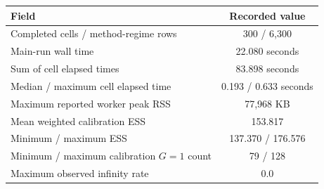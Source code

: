 \begin{tabular}{lc}
\toprule
Field & Recorded value \\
\midrule
Completed cells / method-regime rows & 300 / 6,300 \\
Main-run wall time & 22.080 seconds \\
Sum of cell elapsed times & 83.898 seconds \\
Median / maximum cell elapsed time & 0.193 / 0.633 seconds \\
Maximum reported worker peak RSS & 77,968 KB \\
Mean weighted calibration ESS & 153.817 \\
Minimum / maximum ESS & 137.370 / 176.576 \\
Minimum / maximum calibration $G=1$ count & 79 / 128 \\
Maximum observed infinity rate & 0.0 \\
\bottomrule
\end{tabular}

